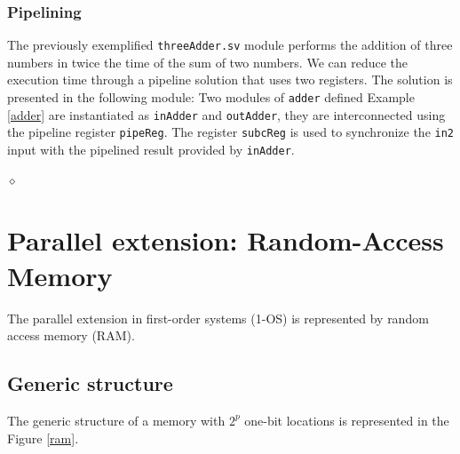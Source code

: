 \subsubsection{Pipelining}

\begin{exemplu}
The previously exemplified {\tt threeAdder.sv} module performs the addition of three numbers in twice the time of the sum of two numbers. We can reduce the execution time through a pipeline solution that uses two registers. The solution is presented in the following module:
{\em
{}
}  
Two modules of {\tt adder} defined Example \ref{adder}
are instantiated as {\tt inAdder} and {\tt outAdder}, they are
interconnected using the pipeline  register {\tt pipeReg}. The register {\tt subcReg} is used to synchronize the {\tt in2} input with the pipelined result provided by {\tt inAdder}.

$\diamond$
\end{exemplu}


\section{Parallel extension: Random-Access Memory}

The parallel extension in first-order systems (1-OS) is represented by random access memory (RAM).

\subsection{Generic structure}

The generic structure of a memory with $2^p$ one-bit locations is represented in the Figure \ref{ram}.


